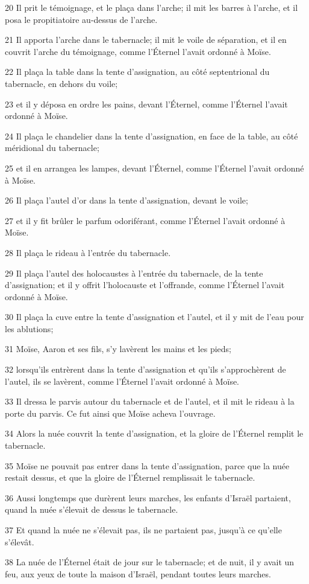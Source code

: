 \par 20 Il prit le témoignage, et le plaça dans l'arche; il mit les barres à l'arche, et il posa le propitiatoire au-dessus de l'arche.
\par 21 Il apporta l'arche dans le tabernacle; il mit le voile de séparation, et il en couvrit l'arche du témoignage, comme l'Éternel l'avait ordonné à Moïse.
\par 22 Il plaça la table dans la tente d'assignation, au côté septentrional du tabernacle, en dehors du voile;
\par 23 et il y déposa en ordre les pains, devant l'Éternel, comme l'Éternel l'avait ordonné à Moïse.
\par 24 Il plaça le chandelier dans la tente d'assignation, en face de la table, au côté méridional du tabernacle;
\par 25 et il en arrangea les lampes, devant l'Éternel, comme l'Éternel l'avait ordonné à Moïse.
\par 26 Il plaça l'autel d'or dans la tente d'assignation, devant le voile;
\par 27 et il y fit brûler le parfum odoriférant, comme l'Éternel l'avait ordonné à Moïse.
\par 28 Il plaça le rideau à l'entrée du tabernacle.
\par 29 Il plaça l'autel des holocaustes à l'entrée du tabernacle, de la tente d'assignation; et il y offrit l'holocauste et l'offrande, comme l'Éternel l'avait ordonné à Moïse.
\par 30 Il plaça la cuve entre la tente d'assignation et l'autel, et il y mit de l'eau pour les ablutions;
\par 31 Moïse, Aaron et ses fils, s'y lavèrent les mains et les pieds;
\par 32 lorsqu'ils entrèrent dans la tente d'assignation et qu'ils s'approchèrent de l'autel, ils se lavèrent, comme l'Éternel l'avait ordonné à Moïse.
\par 33 Il dressa le parvis autour du tabernacle et de l'autel, et il mit le rideau à la porte du parvis. Ce fut ainsi que Moïse acheva l'ouvrage.
\par 34 Alors la nuée couvrit la tente d'assignation, et la gloire de l'Éternel remplit le tabernacle.
\par 35 Moïse ne pouvait pas entrer dans la tente d'assignation, parce que la nuée restait dessus, et que la gloire de l'Éternel remplissait le tabernacle.
\par 36 Aussi longtemps que durèrent leurs marches, les enfants d'Israël partaient, quand la nuée s'élevait de dessus le tabernacle.
\par 37 Et quand la nuée ne s'élevait pas, ils ne partaient pas, jusqu'à ce qu'elle s'élevât.
\par 38 La nuée de l'Éternel était de jour sur le tabernacle; et de nuit, il y avait un feu, aux yeux de toute la maison d'Israël, pendant toutes leurs marches.



